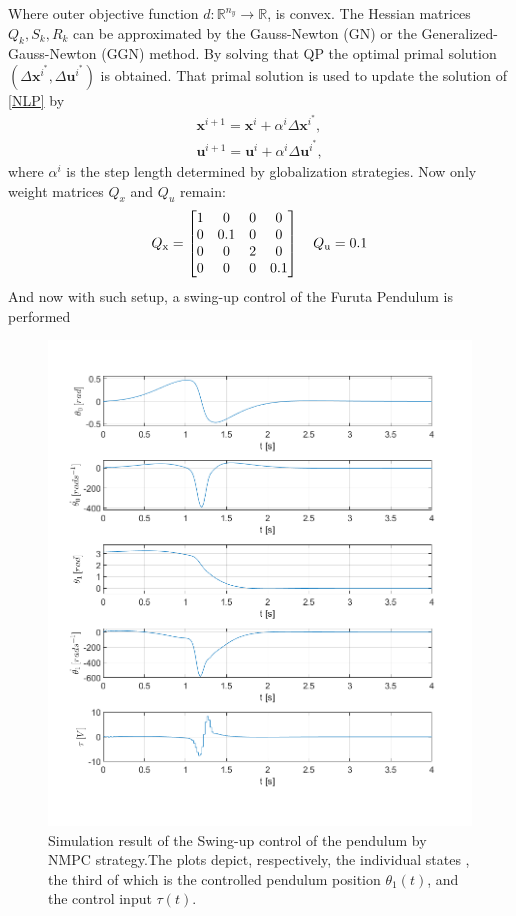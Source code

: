 Where outer objective function $d:\mathbb{R}^{n_y}\rightarrow \mathbb{R}$, is convex. The Hessian matrices $Q_k,S_k,R_k$ can be approximated by the Gauss-Newton (GN) or the Generalized-Gauss-Newton (GGN) method. By solving that QP the optimal primal solution $(\Delta \mathbf{x}^{i^*}, \Delta \mathbf{u}^{i^*})$ is obtained. That primal solution is used to update the solution of \eqref{NLP} by
\begin{subequations}
	\begin{align}
	\mathbf{x}^{i+1} = \mathbf{x}^{i} + \alpha^i \Delta\mathbf{x}^{i^*}, \\ \mathbf{u}^{i+1} = \mathbf{u}^{i} + \alpha^i \Delta\mathbf{u}^{i^*},
	\end{align}
\end{subequations}
where $\alpha^i$ is the step length determined by globalization strategies. 
Now only weight matrices $Q_x$ and $Q_u$ remain:
\begin{equation}
	Q _{\text{x}} = \begin{bmatrix}
	1&0&0&0\\
	0&0.1&0&0\\
	0&0&2&0\\
	0&0&0&0.1
	\end{bmatrix} \quad Q _{\text{u}} = 0.1
\end{equation}
And now with such setup, a swing-up control of the Furuta Pendulum is performed
\newpage
\begin{figure}[H]
	\centering
	\includegraphics[width=1.1\linewidth]{images/NMPC}
	\caption{Simulation result of the Swing-up control of the pendulum by NMPC strategy.The plots depict, respectively, the individual states , the third of which is the controlled pendulum position $\theta_1(t)$, and the control input $\tau(t)$.}
	\label{NMPC}
\end{figure}